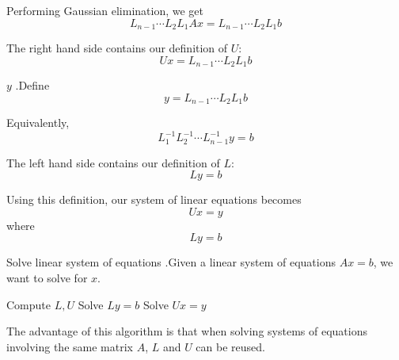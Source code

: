 \documentclass[12pt,letterpaper]{article}
\begin{document}
Performing Gaussian elimination, we get
\begin{equation}
	L_{n-1} \cdots L_2 L_1 A x = L_{n-1} \cdots L_2 L_1 b
\end{equation}

The right hand side contains our definition of $U$:
\begin{equation}
	U x = L_{n-1} \cdots L_2 L_1 b
\end{equation}

\begin{defn}{$y$}
.Define
\begin{equation}
	y = L_{n-1} \cdots L_2 L_1 b
\end{equation}

Equivalently,
\begin{equation}
	L_1^{-1} L_2^{-1} \cdots L_{n-1}^{-1} y = b
\end{equation}

The left hand side contains our definition of $L$:
\begin{equation}
	Ly = b
\end{equation}
\label{defn:y}
\end{defn}

Using this definition, our system of linear equations becomes
\begin{equation}
	Ux = y
\end{equation}
where
\begin{equation}
	Ly = b
\end{equation}

\begin{algo}{Solve linear system of equations}
.Given a linear system of equations $Ax = b$, we want to solve for $x$.

\begin{algorithm}[H]
\caption{Solve $Ax = b$ for $x$}
\begin{algorithmic}[1]
\State Compute $L, U$ 
\State Solve $Ly = b$ 
\State Solve $Ux = y$ 
\end{algorithmic}
\end{algorithm}

The advantage of this algorithm is that when solving systems of equations involving the same matrix $A$, $L$ and $U$ can be reused.
\label{alg:gauss}
\end{algo}
\end{document}
